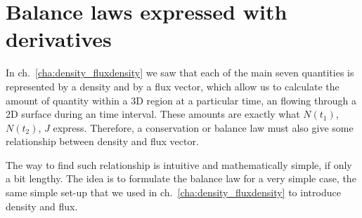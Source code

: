 \documentclass[a4paper,12pt,%
onecolumn,oneside,titlepage,%
british%
]{memoir}
\renewcommand*{\|}[1][]{\nonscript\:#1\vert\nonscript\:\mathopen{}}
\newcommand*{\chap}{ch.}%
\newcommand*{\yN}{N}
\newcommand*{\yJ}{J}
\begin{document}
\section{Balance laws expressed with derivatives}
\label{sec:balance_derivative}

In \chap~\ref{cha:density_fluxdensity} we saw that each of the main seven quantities is represented by a density and by a flux vector, which allow us to calculate the amount of quantity within a 3D region at a particular time, an flowing through a 2D surface during an time interval. These amounts are exactly what $\yN(t_{1})$, $\yN(t_{2})$, $\yJ$ express. Therefore, a conservation or balance law must also give some relationship between density and flux vector.

The way to find such relationship is intuitive and mathematically simple, if only a bit lengthy. The idea is to formulate the balance law for a very simple case, the same simple set-up that we used in \chap~\ref{cha:density_fluxdensity} to introduce density and flux.
\end{document}
